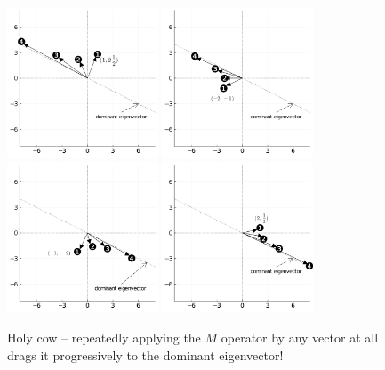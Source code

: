 \begin{figure}[ht]
\centering
\includegraphics[width=0.4\textwidth]{converge1.png} \quad
\includegraphics[width=0.4\textwidth]{converge2.png} \\
\includegraphics[width=0.4\textwidth]{converge3.png} \quad
\includegraphics[width=0.4\textwidth]{converge4.png}
\caption{Holy cow -- repeatedly applying the $M$ operator by any vector at all
drags it progressively to the dominant eigenvector!}
\label{converge1}
\end{figure}

